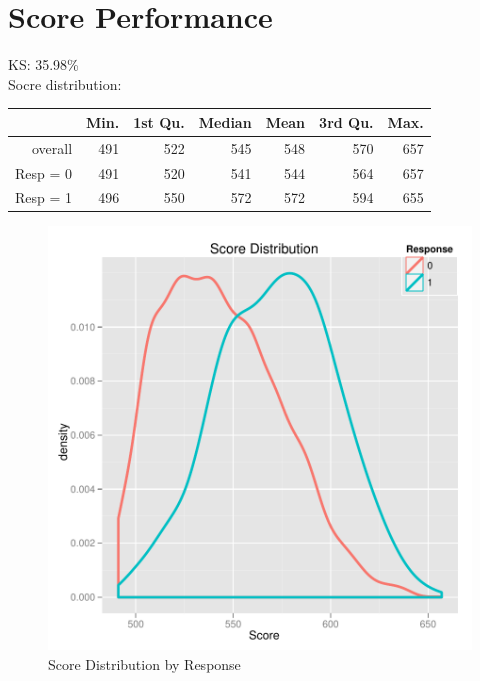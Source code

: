 \documentclass[a4paper]{article}
\begin{document}
\section{Score Performance}
KS:  35.98\% \\
Socre distribution:
\begin{center}
\begin{table}[ht]
\begin{center}
\begin{tabular}{rrrrrrr}
  \hline
 & Min. & 1st Qu. & Median & Mean & 3rd Qu. & Max. \\ 
  \hline
overall & 491 & 522 & 545 & 548 & 570 & 657 \\ 
  Resp = 0 & 491 & 520 & 541 & 544 & 564 & 657 \\ 
  Resp = 1 & 496 & 550 & 572 & 572 & 594 & 655 \\ 
   \hline
\end{tabular}
\end{center}
\end{table}\end{center}


\begin{figure}[!ht]
\centering
\includegraphics{score-by-y}
\caption{Score Distribution by Response}
\end{figure}
\end{document}
